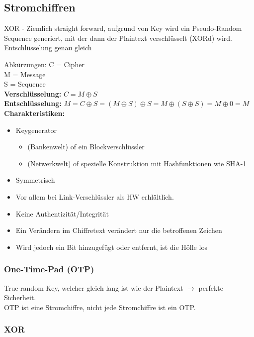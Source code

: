 \documentclass[12pt]{scrartcl}
\begin{document}
\subsection{Stromchiffren}

XOR - Ziemlich straight forward, aufgrund von Key wird ein Pseudo-Random Sequence generiert, mit
der dann der Plaintext verschlüsselt (XORd) wird. Entschlüsselung genau gleich

Abkürzungen:
C = Cipher \\
M = Message \\
S = Sequence \\

\textbf{Verschlüsselung:} $C = M \oplus S$ \\
\textbf{Entschlüsselung:} $M = C \oplus S = (M \oplus S) \oplus S = M \oplus (S \oplus S) = M \oplus 0 = M$ \\


\textbf{Charakteristiken:}
\begin{itemize}
    \item Keygenerator
    \begin{itemize}
        \item (Bankenwelt) of ein Blockverschlüssler
        \item (Netwerkwelt) of spezielle Konstruktion mit Hashfunktionen wie SHA-1
    \end{itemize}
    \item Symmetrisch
    \item Vor allem bei Link-Verschlüssler als HW erhlältlich.
    \item Keine Authentizität/Integrität
    \item Ein Verändern im Chiffretext verändert nur die betroffenen Zeichen
    \item Wird jedoch ein Bit hinzugefügt oder entfernt, ist die Hölle los
\end{itemize}

\subsubsection{One-Time-Pad (OTP)}

True-random Key, welcher gleich lang ist wie der Plaintext $\rightarrow$ perfekte Sicherheit.\\

OTP ist eine Stromchiffre, nicht jede Stromchiffre ist ein OTP.



\subsubsection{XOR}
\end{document}
